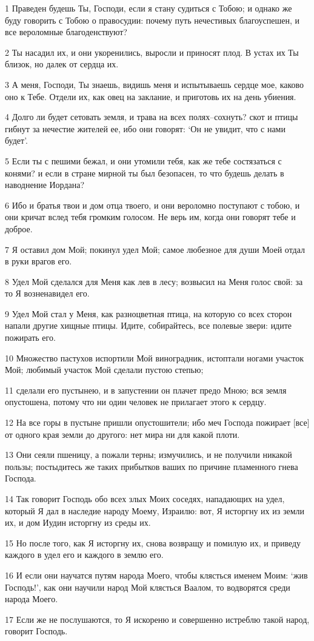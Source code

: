 \par 1 Праведен будешь Ты, Господи, если я стану судиться с Тобою; и однако же буду говорить с Тобою о правосудии: почему путь нечестивых благоуспешен, и все вероломные благоденствуют?
\par 2 Ты насадил их, и они укоренились, выросли и приносят плод. В устах их Ты близок, но далек от сердца их.
\par 3 А меня, Господи, Ты знаешь, видишь меня и испытываешь сердце мое, каково оно к Тебе. Отдели их, как овец на заклание, и приготовь их на день убиения.
\par 4 Долго ли будет сетовать земля, и трава на всех полях--сохнуть? скот и птицы гибнут за нечестие жителей ее, ибо они говорят: `Он не увидит, что с нами будет'.
\par 5 Если ты с пешими бежал, и они утомили тебя, как же тебе состязаться с конями? и если в стране мирной ты был безопасен, то что будешь делать в наводнение Иордана?
\par 6 Ибо и братья твои и дом отца твоего, и они вероломно поступают с тобою, и они кричат вслед тебя громким голосом. Не верь им, когда они говорят тебе и доброе.
\par 7 Я оставил дом Мой; покинул удел Мой; самое любезное для души Моей отдал в руки врагов его.
\par 8 Удел Мой сделался для Меня как лев в лесу; возвысил на Меня голос свой: за то Я возненавидел его.
\par 9 Удел Мой стал у Меня, как разноцветная птица, на которую со всех сторон напали другие хищные птицы. Идите, собирайтесь, все полевые звери: идите пожирать его.
\par 10 Множество пастухов испортили Мой виноградник, истоптали ногами участок Мой; любимый участок Мой сделали пустою степью;
\par 11 сделали его пустынею, и в запустении он плачет предо Мною; вся земля опустошена, потому что ни один человек не прилагает этого к сердцу.
\par 12 На все горы в пустыне пришли опустошители; ибо меч Господа пожирает [все] от одного края земли до другого: нет мира ни для какой плоти.
\par 13 Они сеяли пшеницу, а пожали терны; измучились, и не получили никакой пользы; постыдитесь же таких прибытков ваших по причине пламенного гнева Господа.
\par 14 Так говорит Господь обо всех злых Моих соседях, нападающих на удел, который Я дал в наследие народу Моему, Израилю: вот, Я исторгну их из земли их, и дом Иудин исторгну из среды их.
\par 15 Но после того, как Я исторгну их, снова возвращу и помилую их, и приведу каждого в удел его и каждого в землю его.
\par 16 И если они научатся путям народа Моего, чтобы клясться именем Моим: `жив Господь!', как они научили народ Мой клясться Ваалом, то водворятся среди народа Моего.
\par 17 Если же не послушаются, то Я искореню и совершенно истреблю такой народ, говорит Господь.


